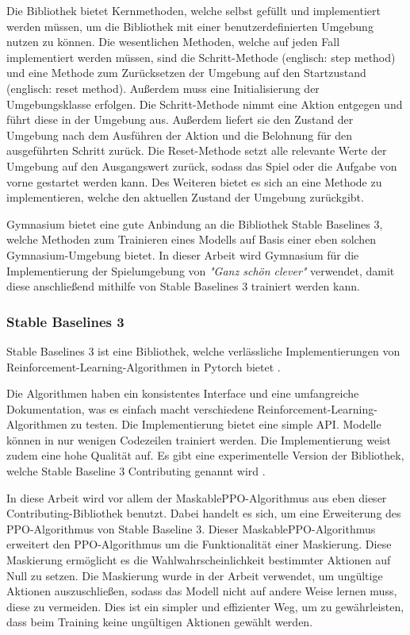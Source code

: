Die Bibliothek bietet Kernmethoden, welche selbst gefüllt und implementiert werden müssen, um die Bibliothek mit einer benutzerdefinierten Umgebung nutzen zu können. Die wesentlichen Methoden, welche auf jeden Fall implementiert werden müssen, sind die Schritt-Methode (englisch: step method) und eine Methode zum Zurücksetzen der Umgebung auf den Startzustand (englisch: reset method). Außerdem muss eine Initialisierung der Umgebungsklasse erfolgen. Die Schritt-Methode nimmt eine Aktion entgegen und führt diese in der Umgebung aus. Außerdem liefert sie den Zustand der Umgebung nach dem Ausführen der Aktion und die Belohnung für den ausgeführten Schritt zurück. Die Reset-Methode setzt alle relevante Werte der Umgebung auf den Ausgangswert zurück, sodass das Spiel oder die Aufgabe von vorne gestartet werden kann. Des Weiteren bietet es sich an eine Methode zu implementieren, welche den aktuellen Zustand der Umgebung zurückgibt.

Gymnasium bietet eine gute Anbindung an die Bibliothek Stable Baselines 3, welche Methoden zum Trainieren eines Modells auf Basis einer eben solchen Gymnasium-Umgebung bietet. In dieser Arbeit wird Gymnasium für die Implementierung der Spielumgebung von \textit{"Ganz schön clever"} verwendet, damit diese anschließend mithilfe von Stable Baselines 3 trainiert werden kann.
\subsubsection{Stable Baselines 3}
Stable Baselines 3 ist eine Bibliothek, welche verlässliche Implementierungen von Reinforcement-Learning-Algorithmen in Pytorch bietet \cite[S. 1]{stable-baselines3}. 

Die Algorithmen haben ein konsistentes Interface und eine umfangreiche Dokumentation, was es einfach macht verschiedene Reinforcement-Learning-Algorithmen zu testen. Die Implementierung bietet eine simple API. Modelle können in nur wenigen Codezeilen trainiert werden. Die Implementierung weist zudem eine hohe Qualität auf. Es gibt eine experimentelle Version der Bibliothek, welche Stable Baseline 3 Contributing genannt wird \cite[S. 1-3]{stable-baselines3}.

In diese Arbeit wird vor allem der MaskablePPO-Algorithmus aus eben dieser Contributing-Bibliothek benutzt. Dabei handelt es sich, um eine Erweiterung des PPO-Algorithmus von Stable Baseline 3. Dieser MaskablePPO-Algorithmus erweitert den PPO-Algorithmus um die Funktionalität einer Maskierung. Diese Maskierung ermöglicht es die Wahlwahrscheinlichkeit bestimmter Aktionen auf Null zu setzen. Die Maskierung wurde in der Arbeit verwendet, um ungültige Aktionen auszuschließen, sodass das Modell nicht auf andere Weise lernen muss, diese zu vermeiden. Dies ist ein simpler und effizienter Weg, um zu gewährleisten, dass beim Training keine ungültigen Aktionen gewählt werden.
